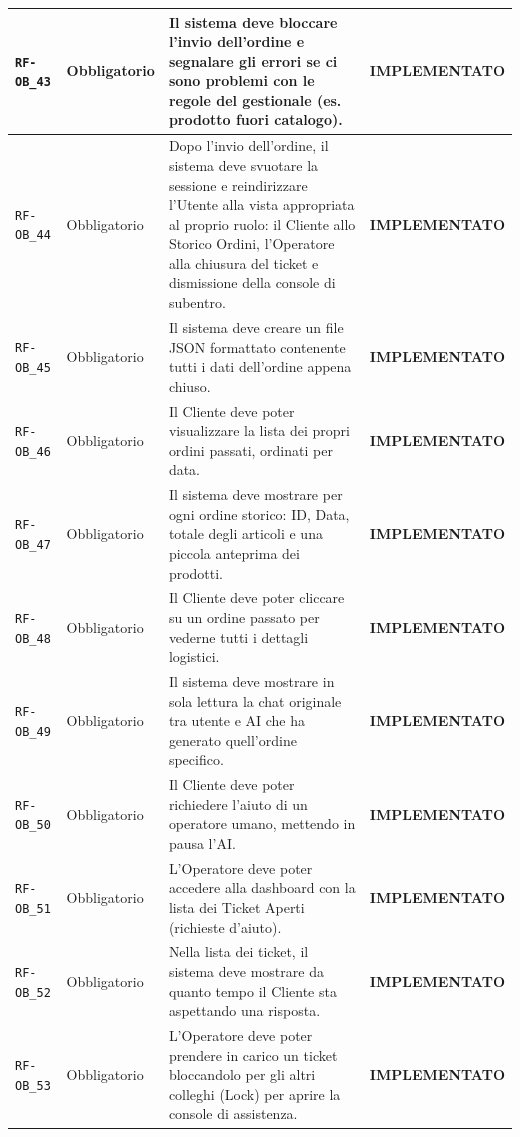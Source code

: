 \documentclass[a4paper, 11pt, oneside]{scrartcl}
\begin{document}
\begin{longtable}{|>{\raggedright\arraybackslash}p{}|>{\raggedright\arraybackslash}p{}|>{\raggedright\arraybackslash}p{}|>{\raggedright\arraybackslash}p{}|}
    \hline
    \texttt{RF-OB\_43} & Obbligatorio & Il sistema deve bloccare l'invio dell'ordine e segnalare gli errori se ci sono problemi con le regole del gestionale (es. prodotto fuori catalogo). & \textbf{IMPLEMENTATO} \\
    \hline
    \texttt{RF-OB\_44} & Obbligatorio & Dopo l'invio dell'ordine, il sistema deve svuotare la sessione e reindirizzare l'Utente alla vista appropriata al proprio ruolo: il Cliente allo Storico Ordini, l'Operatore alla chiusura del ticket e dismissione della console di subentro. & \textbf{IMPLEMENTATO} \\
    \hline
    \texttt{RF-OB\_45} & Obbligatorio & Il sistema deve creare un file JSON formattato contenente tutti i dati dell'ordine appena chiuso. & \textbf{IMPLEMENTATO} \\
    \hline
    \texttt{RF-OB\_46} & Obbligatorio & Il Cliente deve poter visualizzare la lista dei propri ordini passati, ordinati per data. & \textbf{IMPLEMENTATO} \\
    \hline
    \texttt{RF-OB\_47} & Obbligatorio & Il sistema deve mostrare per ogni ordine storico: ID, Data, totale degli articoli e una piccola anteprima dei prodotti. & \textbf{IMPLEMENTATO} \\
    \hline
    \texttt{RF-OB\_48} & Obbligatorio & Il Cliente deve poter cliccare su un ordine passato per vederne tutti i dettagli logistici. & \textbf{IMPLEMENTATO} \\
    \hline
    \texttt{RF-OB\_49} & Obbligatorio & Il sistema deve mostrare in sola lettura la chat originale tra utente e AI che ha generato quell'ordine specifico. & \textbf{IMPLEMENTATO} \\
    \hline
    \texttt{RF-OB\_50} & Obbligatorio & Il Cliente deve poter richiedere l'aiuto di un operatore umano, mettendo in pausa l'AI. & \textbf{IMPLEMENTATO} \\
    \hline
    \texttt{RF-OB\_51} & Obbligatorio & L'Operatore deve poter accedere alla dashboard con la lista dei Ticket Aperti (richieste d'aiuto). & \textbf{IMPLEMENTATO} \\
    \hline
    \texttt{RF-OB\_52} & Obbligatorio & Nella lista dei ticket, il sistema deve mostrare da quanto tempo il Cliente sta aspettando una risposta. & \textbf{IMPLEMENTATO} \\
    \hline
    \texttt{RF-OB\_53} & Obbligatorio & L'Operatore deve poter prendere in carico un ticket bloccandolo per gli altri colleghi (Lock) per aprire la console di assistenza. & \textbf{IMPLEMENTATO} \\

\end{longtable}
\end{document}
